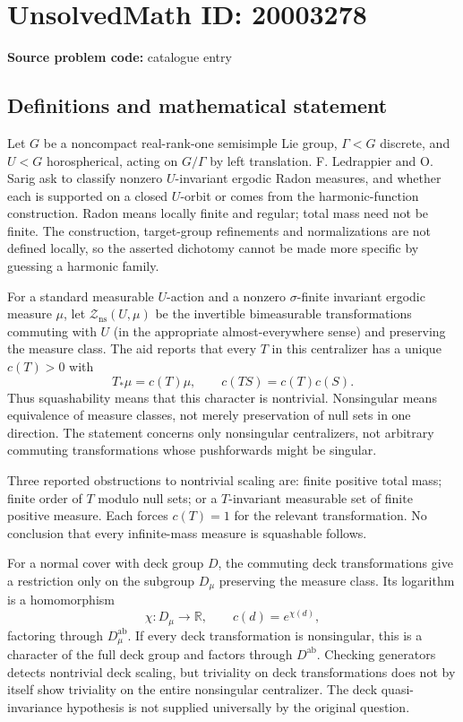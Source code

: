 \documentclass[11pt]{article}
\newcommand{\R}{\mathbb{R}}
\begin{document}
\section*{UnsolvedMath ID: 20003278}
\textbf{Source problem code:} catalogue entry
\subsection{Definitions and mathematical statement}
Let $G$ be a noncompact real-rank-one semisimple Lie group, $\Gamma<G$ discrete, and $U<G$ horospherical, acting on $G/\Gamma$ by left translation. F. Ledrappier and O. Sarig ask to classify nonzero $U$-invariant ergodic Radon measures, and whether each is supported on a closed $U$-orbit or comes from the harmonic-function construction. Radon means locally finite and regular; total mass need not be finite. The construction, target-group refinements and normalizations are not defined locally, so the asserted dichotomy cannot be made more specific by guessing a harmonic family.

For a standard measurable $U$-action and a nonzero $\sigma$-finite invariant ergodic measure $\mu$, let $\mathcal Z_{\mathrm{ns}}(U,\mu)$ be the invertible bimeasurable transformations commuting with $U$ (in the appropriate almost-everywhere sense) and preserving the measure class. The aid reports that every $T$ in this centralizer has a unique $c(T)>0$ with
\[
 T_*\mu=c(T)\mu,\qquad c(TS)=c(T)c(S).
\]
Thus squashability means that this character is nontrivial. Nonsingular means equivalence of measure classes, not merely preservation of null sets in one direction. The statement concerns only nonsingular centralizers, not arbitrary commuting transformations whose pushforwards might be singular.

Three reported obstructions to nontrivial scaling are: finite positive total mass; finite order of $T$ modulo null sets; or a $T$-invariant measurable set of finite positive measure. Each forces $c(T)=1$ for the relevant transformation. No conclusion that every infinite-mass measure is squashable follows.

For a normal cover with deck group $D$, the commuting deck transformations give a restriction only on the subgroup $D_\mu$ preserving the measure class. Its logarithm is a homomorphism
\[
 \chi:D_\mu\to\R,\qquad c(d)=e^{\chi(d)},
\]
factoring through $D_\mu^{\mathrm{ab}}$. If every deck transformation is nonsingular, this is a character of the full deck group and factors through $D^{\mathrm{ab}}$. Checking generators detects nontrivial deck scaling, but triviality on deck transformations does not by itself show triviality on the entire nonsingular centralizer. The deck quasi-invariance hypothesis is not supplied universally by the original question.
\end{document}
